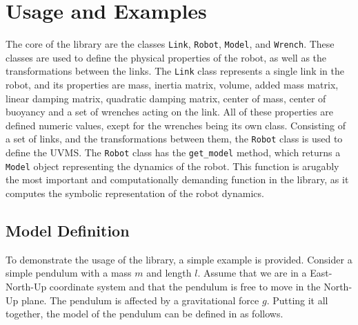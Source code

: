 \section{Usage and Examples}

The core of the \pymuvs{} library are the classes \texttt{Link}, \texttt{Robot}, \texttt{Model},
and \texttt{Wrench}. These classes are used to define the physical properties of the
robot, as well as the transformations between the links. The \texttt{Link} class
represents a single link in the robot, and its properties are mass, inertia matrix,
volume, added mass matrix, linear damping matrix, quadratic damping matrix, center of
mass, center of buoyancy and a set of wrenches acting on the link. All of these
properties are defined numeric values, exept for the wrenches being its own class.
Consisting of a set of links, and the transformations
between them, the \texttt{Robot} class is used to define the UVMS. The \texttt{Robot} class
has the \texttt{get\_model} method, which returns a \texttt{Model} object representing the
dynamics of the robot. This function is arugably the most important and computationally
demanding function in the library, as it computes the symbolic representation of the
robot dynamics.

\subsection{Model Definition}

To demonstrate the usage of the \pymuvs{} library, a simple example is provided.
Consider a simple pendulum with a mass $m$ and length $l$. Assume that we are in
a East-North-Up coordinate system and that the pendulum is free to move in the
North-Up plane. The pendulum is affected by a gravitational force $g$. Putting
it all together, the model of the pendulum can be defined in \pymuvs{} as follows.

